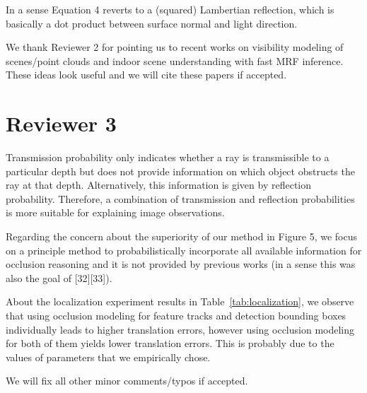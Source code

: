 \documentclass[10pt,twocolumn,letterpaper]{article}
\begin{document}
In a sense Equation 4 reverts to a (squared) Lambertian reflection, which is basically a dot product between surface normal and light direction.

We thank Reviewer 2 for pointing us to recent works on visibility modeling of scenes/point clouds and indoor scene understanding with fast MRF inference. These ideas look useful and we will cite these papers if accepted.

\section{Reviewer 3}

Transmission probability only indicates whether a ray is transmissible to a particular depth but does not provide information on which object obstructs the ray at that depth. Alternatively, this information is given by reflection probability. Therefore, a combination of transmission and reflection probabilities is more suitable for explaining image observations.

Regarding the concern about the superiority of our method in Figure 5, we focus on a principle method to probabilistically incorporate all available information for occlusion reasoning and it is not provided by previous works (in a sense this was also the goal of [32][33]).

About the localization experiment results in Table~\ref{tab:localization}, we observe that using occlusion modeling for feature tracks and detection bounding boxes individually leads to higher translation errors, however using occlusion modeling for both of them yields lower translation errors. This is probably due to the values of parameters that we empirically chose.

We will fix all other minor comments/typos if accepted.
\end{document}
